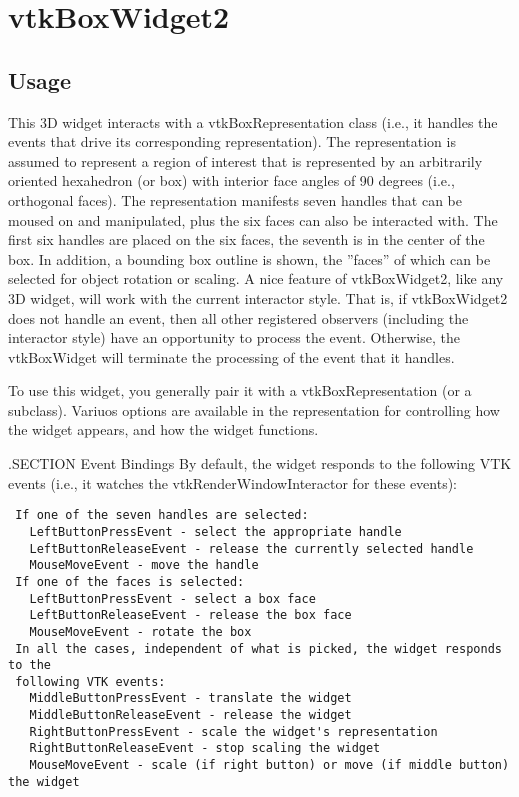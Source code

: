 \section{vtkBoxWidget2}

\subsection{Usage}

 This 3D widget interacts with a vtkBoxRepresentation class (i.e., it
 handles the events that drive its corresponding representation). The
 representation is assumed to represent a region of interest that is
 represented by an arbitrarily oriented hexahedron (or box) with interior
 face angles of 90 degrees (i.e., orthogonal faces). The representation
 manifests seven handles that can be moused on and manipulated, plus the
 six faces can also be interacted with. The first six handles are placed on
 the six faces, the seventh is in the center of the box. In addition, a
 bounding box outline is shown, the ''faces'' of which can be selected for
 object rotation or scaling. A nice feature of vtkBoxWidget2, like any 3D
 widget, will work with the current interactor style. That is, if
 vtkBoxWidget2 does not handle an event, then all other registered
 observers (including the interactor style) have an opportunity to process
 the event. Otherwise, the vtkBoxWidget will terminate the processing of
 the event that it handles.

 To use this widget, you generally pair it with a vtkBoxRepresentation
 (or a subclass). Variuos options are available in the representation for 
 controlling how the widget appears, and how the widget functions.

 .SECTION Event Bindings
 By default, the widget responds to the following VTK events (i.e., it
 watches the vtkRenderWindowInteractor for these events):
 \begin{verbatim}
 If one of the seven handles are selected:
   LeftButtonPressEvent - select the appropriate handle 
   LeftButtonReleaseEvent - release the currently selected handle 
   MouseMoveEvent - move the handle
 If one of the faces is selected:
   LeftButtonPressEvent - select a box face
   LeftButtonReleaseEvent - release the box face
   MouseMoveEvent - rotate the box
 In all the cases, independent of what is picked, the widget responds to the 
 following VTK events:
   MiddleButtonPressEvent - translate the widget
   MiddleButtonReleaseEvent - release the widget
   RightButtonPressEvent - scale the widget's representation
   RightButtonReleaseEvent - stop scaling the widget
   MouseMoveEvent - scale (if right button) or move (if middle button) the widget
 \end{verbatim}

